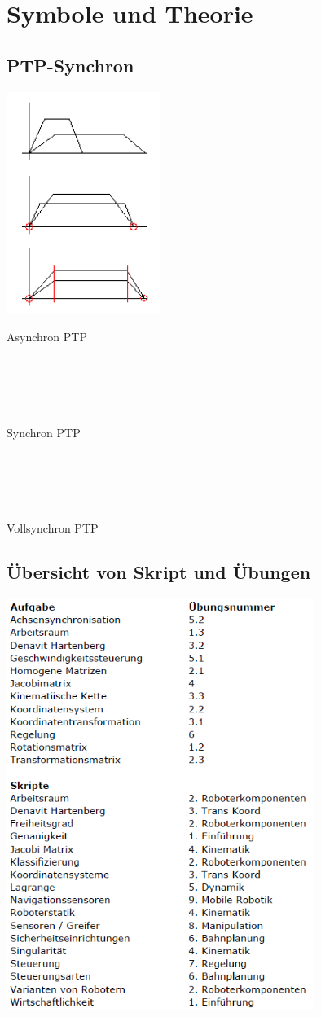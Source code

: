 \section{Symbole und Theorie}

	\subsection{PTP-Synchron}
	\begin{minipage}{6cm}
		\includegraphics[width=5cm]{./bilder/synchron.png}
    \end{minipage}
	\begin{minipage}{12.5cm}
    	Asynchron PTP\\ \\ \\ \\ \\ \\
    	Synchron PTP\\ \\ \\ \\ \\ \\
    	Vollsynchron PTP\\
    \end{minipage}

	\subsection{Übersicht von Skript und Übungen}
	\includegraphics[width=10cm]{./bilder/uebersicht.png}
